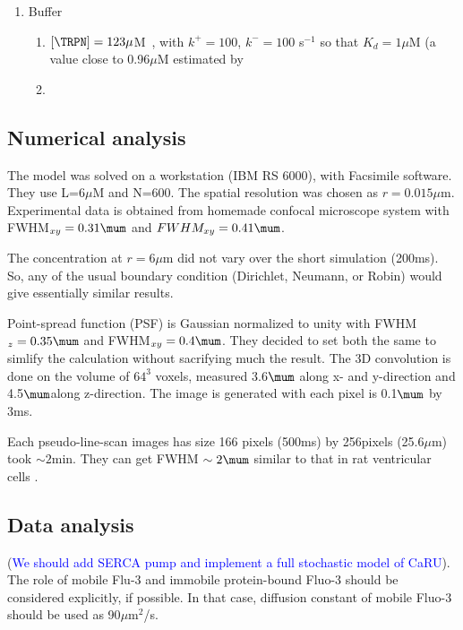 \begin{enumerate}
\item Buffer
  \begin{enumerate}
    
  \item $[\TRPN]=123\mu$M~\citep{berlin1994iccb}, with
    $k^+=100$\tunitkp, $k^-=100$ s$^{-1}$ so that 
    $K_d=1\mu$M (a value close to 0.96$\mu$M estimated by~\citep{berlin1994iccb}
  
  \item 
  \end{enumerate}
\end{enumerate}


\subsection{Numerical analysis}
\label{sec:numerical-analysis-7}

The model was solved on a workstation (IBM RS 6000), with Facsimile
software.  They use L=6$\mu$M and N=600. The spatial resolution was
chosen as $r=0.015\mu$m. Experimental data is obtained from homemade confocal
microscope system \citep{parker1997} with FWHM$_{xy}=0.31\mum$ and
$FWHM_{xy}=0.41\mum$. 

The concentration at $r=6\mu$m did not vary over the short simulation
(200ms). So, any of the usual boundary condition (Dirichlet, Neumann,
or Robin) would give essentially similar results.

Point-spread function (PSF) is Gaussian normalized to unity with
FWHM$_z=0.35\mum$ and FWHM$_{xy}=0.4\mum$. They decided to set both the same to
simlify the calculation without sacrifying much the result. The 3D convolution
is done on the volume of $64^3$ voxels, measured 3.6$\mum$ along x- and
y-direction and 4.5$\mum$along z-direction. The image is generated with each
pixel is 0.1$\mum$ by 3ms.


Each pseudo-line-scan images has size 166 pixels (500ms) by 256pixels
(25.6$\mu$m) took $\sim 2$min. They can get FWHM $\sim 2\mum$ similar to that in
rat ventricular cells \citep{gomez1996}.

\subsection{Data analysis}
\label{sec:data-analysis-7}


(\textcolor{blue}{We should add SERCA pump and implement a full
  stochastic model of CaRU}). The role of mobile Flu-3 and immobile
protein-bound Fluo-3 should be considered explicitly, if possible. In
that case, diffusion constant of mobile Fluo-3 should be used as
90$\mu$m$^2$/s. 

